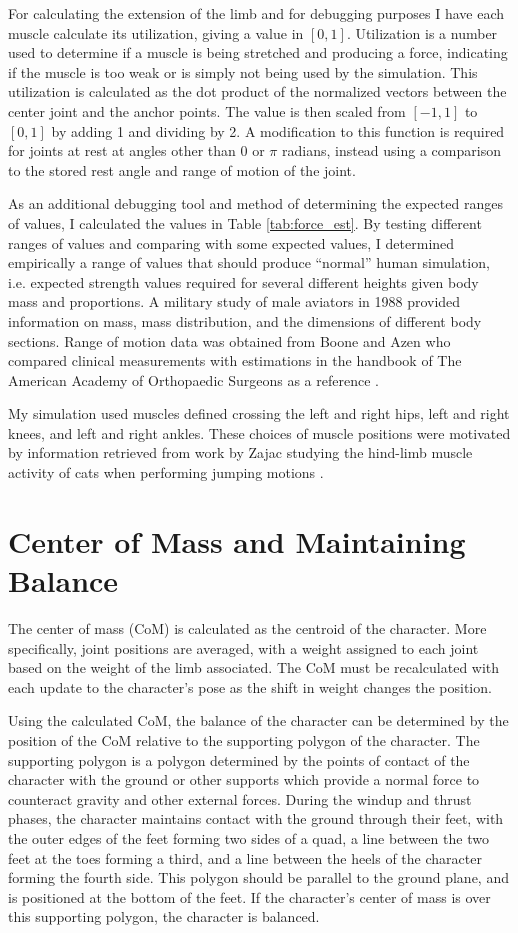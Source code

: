 For calculating the extension of the limb and for debugging purposes I have each muscle calculate its utilization, giving a value in $[0,1]$.  Utilization is a number used to determine if a muscle is being stretched and producing a force, indicating if the muscle is too weak or is simply not being used by the simulation.  This utilization is calculated as the dot product of the normalized vectors between the center joint and the anchor points.  The value is then scaled from $[-1, 1]$ to $[0,1]$ by adding 1 and dividing by 2.  A modification to this function is required for joints at rest at angles other than 0 or $\pi$ radians, instead using a comparison to the stored rest angle and range of motion of the joint.

As an additional debugging tool and method of determining the expected ranges of values, I calculated the values in Table \ref{tab:force_est}.  By testing different ranges of values and comparing with some expected values, I determined empirically a range of values that should produce ``normal'' human simulation, i.e. expected strength values required for several different heights given body mass and proportions.  A military study of male aviators in 1988 provided information on mass, mass distribution, and the dimensions of different body sections.  Range of motion data was obtained from Boone and Azen who compared clinical measurements with estimations in the handbook of The American Academy of Orthopaedic Surgeons as a reference \cite{Boone756}.

My simulation used muscles defined crossing the left and right hips, left and right knees, and left and right ankles.  These choices of muscle positions were motivated by information retrieved from work by Zajac studying the hind-limb muscle activity of cats when performing jumping motions \cite{Zajac73, Zajac979}.

\section{Center of Mass and Maintaining Balance}
\label{section:com}
The center of mass (CoM) is calculated as the centroid of the character.  More specifically, joint positions are averaged, with a weight assigned to each joint based on the weight of the limb associated.  The CoM must be recalculated with each update to the character's pose as the shift in weight changes the position.

Using the calculated CoM, the balance of the character can be determined by the position of the CoM relative to the supporting polygon of the character.  The supporting polygon is a polygon determined by the points of contact of the character with the ground or other supports which provide a normal force to counteract gravity and other external forces.  During the windup and thrust phases, the character maintains contact with the ground through their feet, with the outer edges of the feet forming two sides of a quad, a line between the two feet at the toes forming a third, and a line between the heels of the character forming the fourth side.  This polygon should be parallel to the ground plane, and is positioned at the bottom of the feet.  If the character's center of mass is over this supporting polygon, the character is balanced.

